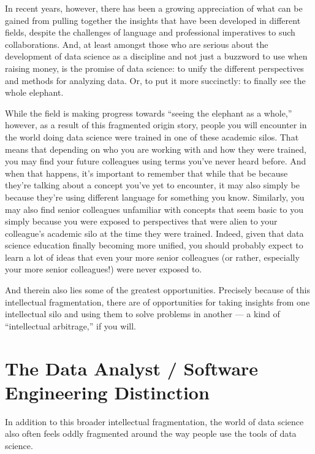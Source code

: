 \documentclass[letterpaper,10pt,english]{jupyterBook}
\begin{document}
\sphinxAtStartPar
In recent years, however, there has been a growing appreciation of what can be gained from pulling together the insights that have been developed in different fields, despite the challenges of language and professional imperatives to such collaborations. And, at least amongst those who are serious about the development of data science as a discipline and not just a buzzword to use when raising money, is the promise of data science: to unify the different perspectives and methods for analyzing data. Or, to put it more succinctly: to finally see the whole elephant.

\sphinxAtStartPar
While the field is making progress towards “seeing the elephant as a whole,” however, as a result of this fragmented origin story,  people you will encounter in the world doing data science were trained in one of these academic silos. That means that depending on who you are working with and how they were trained, you may find your future colleagues using terms you’ve never heard before. And when that happens, it’s important to remember that while that  be because they’re talking about a concept you’ve yet to encounter, it may also simply be because they’re using different language for something you know. Similarly, you may also find senior colleagues unfamiliar with concepts that seem basic to you simply because you were exposed to perspectives that were alien to your colleague’s academic silo at the time they were trained. Indeed, given that data science education  finally becoming more unified, you should probably expect to learn a lot of ideas that even your more senior colleagues (or rather, especially your more senior colleagues!) were never exposed to.

\sphinxAtStartPar
And therein also lies some of the greatest opportunities. Precisely because of this intellectual fragmentation, there are  of opportunities for taking insights from one intellectual silo and using them to solve problems in another — a kind of “intellectual arbitrage,” if you will.


\section{The Data Analyst / Software Engineering Distinction}
\label{\detokenize{10_introduction/40_data_science_in_historical_context:the-data-analyst-software-engineering-distinction}}
\sphinxAtStartPar
In addition to this broader intellectual fragmentation, the world of data science also often feels oddly fragmented around the way people use the tools of data science.
\end{document}
